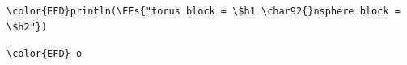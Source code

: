 \documentclass[a4paper]{article}
\numberwithin{equation}{section}
\newcommand{\EFs}[1]{\textcolor{EFs}{#1}} %
\begin{document}
\begin{Code}
\begin{Verbatim}
\color{EFD}println(\EFs{"torus block = \$h1 \char92{}nsphere block = \$h2"})
\end{Verbatim}
\end{Code}

\begin{Code}
\begin{Verbatim}
\color{EFD} o
\end{Verbatim}
\end{Code}
\end{document}

